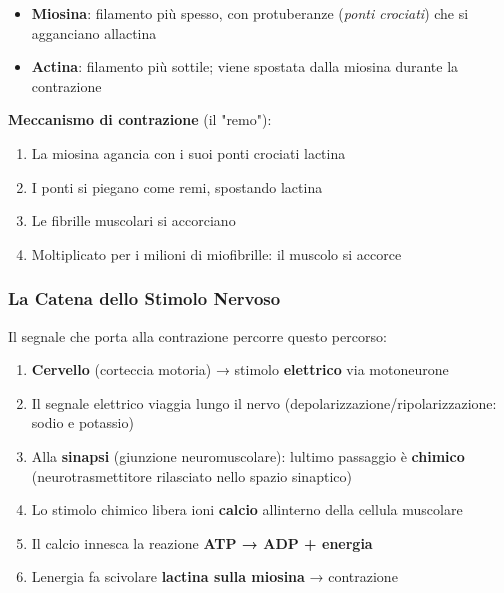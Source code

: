\documentclass[a4paper,11pt]{article}
\providecommand{\tightlist}{%
  \setlength{\itemsep}{0pt}\setlength{\parskip}{0pt}}
\begin{document}
\begin{itemize}
      \tightlist
      \item
            \textbf{Miosina}: filamento più spesso, con protuberanze (\emph{ponti
                  crociati}) che si agganciano all\textquotesingle actina
      \item
            \textbf{Actina}: filamento più sottile; viene spostata dalla miosina
            durante la contrazione
\end{itemize}

\textbf{Meccanismo di contrazione} (il "remo"):

\begin{enumerate}
      \tightlist
      \item
            La miosina agancia con i suoi ponti crociati l\textquotesingle actina
      \item
            I ponti si piegano come remi, spostando l\textquotesingle actina
      \item
            Le fibrille muscolari si accorciano
      \item
            Moltiplicato per i milioni di miofibrille: il muscolo si accorce
\end{enumerate}

\subsubsection{La Catena dello Stimolo
      Nervoso}\label{la-catena-dello-stimolo-nervoso}

Il segnale che porta alla contrazione percorre questo percorso:

\begin{enumerate}
      \tightlist
      \item
            \textbf{Cervello} (corteccia motoria) → stimolo \textbf{elettrico} via
            motoneurone
      \item
            Il segnale elettrico viaggia lungo il nervo
            (depolarizzazione/ripolarizzazione: sodio e potassio)
      \item
            Alla \textbf{sinapsi} (giunzione neuromuscolare):
            l\textquotesingle ultimo passaggio è \textbf{chimico}
            (neurotrasmettitore rilasciato nello spazio sinaptico)
      \item
            Lo stimolo chimico libera ioni \textbf{calcio}
            all\textquotesingle interno della cellula muscolare
      \item
            Il calcio innesca la reazione \textbf{ATP → ADP + energia}
      \item
            L\textquotesingle energia fa scivolare
            \textbf{l\textquotesingle actina sulla miosina} → contrazione
\end{enumerate}
\end{document}
